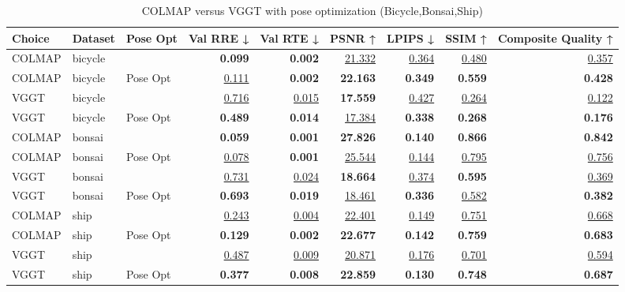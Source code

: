 \begin{table}[H]
\caption{\ifdefined\customcaption \customcaption \else COLMAP versus VGGT with pose optimization (Bicycle,Bonsai,Ship) \fi}
\label{tab:04_pose_opt_bicycle,bonsai,ship}
\centering
\scriptsize
\begin{tabular}{lllrrrrrr}
\toprule
Choice & Dataset & Pose Opt & Val RRE ↓ & Val RTE ↓ & PSNR ↑ & LPIPS ↓ & SSIM ↑ & Composite Quality ↑ \\
\midrule
COLMAP & bicycle &  & \textbf{0.099} & \textbf{0.002} & \underline{21.332} & \underline{0.364} & \underline{0.480} & \underline{0.357} \\
COLMAP & bicycle & Pose Opt & \underline{0.111} & \textbf{0.002} & \textbf{22.163} & \textbf{0.349} & \textbf{0.559} & \textbf{0.428} \\
\midrule
VGGT & bicycle &  & \underline{0.716} & \underline{0.015} & \textbf{17.559} & \underline{0.427} & \underline{0.264} & \underline{0.122} \\
VGGT & bicycle & Pose Opt & \textbf{0.489} & \textbf{0.014} & \underline{17.384} & \textbf{0.338} & \textbf{0.268} & \textbf{0.176} \\
\midrule
COLMAP & bonsai &  & \textbf{0.059} & \textbf{0.001} & \textbf{27.826} & \textbf{0.140} & \textbf{0.866} & \textbf{0.842} \\
COLMAP & bonsai & Pose Opt & \underline{0.078} & \textbf{0.001} & \underline{25.544} & \underline{0.144} & \underline{0.795} & \underline{0.756} \\
\midrule
VGGT & bonsai &  & \underline{0.731} & \underline{0.024} & \textbf{18.664} & \underline{0.374} & \textbf{0.595} & \underline{0.369} \\
VGGT & bonsai & Pose Opt & \textbf{0.693} & \textbf{0.019} & \underline{18.461} & \textbf{0.336} & \underline{0.582} & \textbf{0.382} \\
\midrule
COLMAP & ship &  & \underline{0.243} & \underline{0.004} & \underline{22.401} & \underline{0.149} & \underline{0.751} & \underline{0.668} \\
COLMAP & ship & Pose Opt & \textbf{0.129} & \textbf{0.002} & \textbf{22.677} & \textbf{0.142} & \textbf{0.759} & \textbf{0.683} \\
\midrule
VGGT & ship &  & \underline{0.487} & \underline{0.009} & \underline{20.871} & \underline{0.176} & \underline{0.701} & \underline{0.594} \\
VGGT & ship & Pose Opt & \textbf{0.377} & \textbf{0.008} & \textbf{22.859} & \textbf{0.130} & \textbf{0.748} & \textbf{0.687} \\
\bottomrule
\end{tabular}
\end{table}